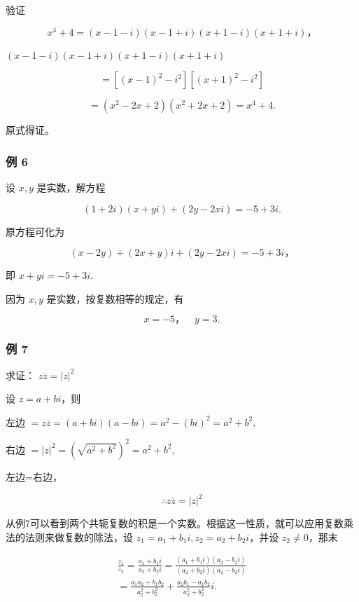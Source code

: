 验证

\[
x ^ {4} + 4 = (x - 1 - i) (x - 1 + i) (x + 1 - i) (x + 1 + i)\text{，}
\]

 \((x - 1 - i)(x - 1 + i)(x + 1 - i)(x + 1 + i)\)

\[
= [ (x - 1) ^ {2} - i ^ {2} ] [ (x + 1) ^ {2} - i ^ {2} ]
\]

\[
= (x ^ {2} - 2 x + 2) (x ^ {2} + 2 x + 2) = x ^ {4} + 4.
\]

原式得证。

\subsubsection{例 6}

设 \(x, y\) 是实数，解方程

\[
(1 + 2 i) (x + y i) + (2 y - 2 x i) = - 5 + 3 i.
\]

 原方程可化为

\[
(x - 2 y) + (2 x + y) i + (2 y - 2 x i) = - 5 + 3 i\text{，}
\]

即 \(x + yi = -5 + 3i.\)

因为 \(x, y\) 是实数，按复数相等的规定，有

\[
x = - 5\text{，} \quad y = 3.
\]

\subsubsection{例 7}

求证： \(z\overline{z}=|z|^{2}\)

 设 \(z = a + bi\)，则

左边 \(= z\overline{z} = (a + bi)(a - bi) = a^2 - (bi)^2 = a^2 + b^2,\)

右边 \(= |z|^2 = (\sqrt{a^2 + b^2})^2 = a^2 + b^2,\)

左边=右边，

\[
\therefore z \overline {{z}} = | z | ^ {2}
\]

从例7可以看到两个共轭复数的积是一个实数。根据这一性质，就可以应用复数乘法的法则来做复数的除法，设
\(z_{1} = a_{1} + b_{1}i, z_{2} = a_{2} + b_{2}i\)，并设
\(z_{2} \neq 0\)，那末

\[
\begin{array}{l} \frac {z _ {1}}{z _ {2}} = \frac {a _ {1} + b _ {1} i}{a _ {2} + b _ {2} i} = \frac {(a _ {1} + b _ {1} i) (a _ {2} - b _ {2} i)}{(a _ {2} + b _ {2} i) (a _ {2} - b _ {2} i)} \\ = \frac {a _ {1} a _ {2} + b _ {1} b _ {2}}{a _ {2} ^ {2} + b _ {2} ^ {2}} + \frac {a _ {2} b _ {1} - a _ {1} b _ {2}}{a _ {2} ^ {2} + b _ {2} ^ {2}} i. \\ \end{array}
\]

